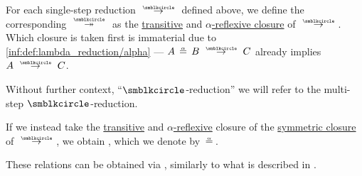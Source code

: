 \begin{definition}
\begin{thmenum}
     For each single-step reduction \( {\pred} \) defined above, we define the corresponding  \( {\pred*} \) as the \hyperref[def:relation_closures/transitive]{transitive} and \hyperref[def:alpha_reflexive]{\( \alpha \)-reflexive closure} of \( {\pred} \). Which closure is taken first is immaterial due to \ref{inf:def:lambda_reduction/alpha} --- \( A \aequiv B \pred C \) already implies \( A \pred C \).

    Without further context, \enquote{\( {\anon} \)-reduction} we will refer to the multi-step \( {\anon} \)-reduction.

     If we instead take the
    \hyperref[def:relation_closures/transitive]{transitive} and \hyperref[def:alpha_reflexive]{\( \alpha \)-reflexive} closure of the \hyperref[def:relation_closures/symmetric]{symmetric closure} of \( \pred \), we obtain , which we denote by \( {\requiv} \).
  \end{thmenum}
\end{definition}
\begin{comments}
  \item These relations can be obtained via , similarly to what is described in .
\end{comments}

